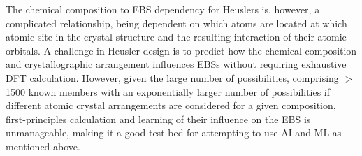 \documentclass[article]{elsarticle}
\begin{document}
The chemical composition to EBS dependency for Heuslers is, however, a complicated relationship, being dependent on which atoms are located at which atomic site in the crystal structure and the resulting interaction of their atomic orbitals.\cite{ojala2010permutation,ma2017computational,ma2018computational} %
A challenge in Heusler design is to predict how the chemical composition and crystallographic arrangement influences EBSs without requiring exhaustive DFT calculation. However, given the large number of possibilities, comprising $>$ \num{1500} known members with an exponentially larger number of possibilities if different atomic crystal arrangements are considered for a given composition, first-principles calculation and learning of their influence on the EBS is unmanageable, making it a good test bed for attempting to use AI and ML as mentioned above.

\end{document}

